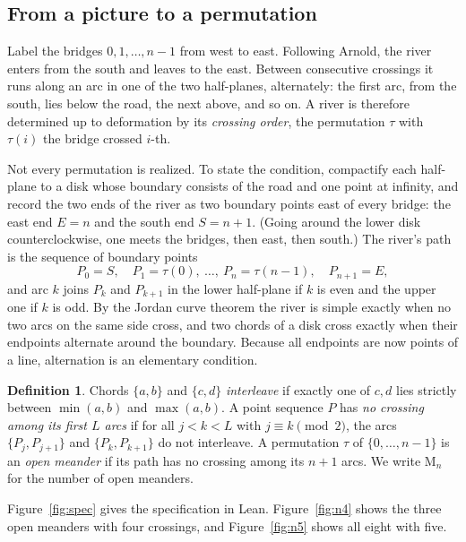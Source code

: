 \documentclass[11pt]{amsart}
\theoremstyle{definition}
\newtheorem{definition}[theorem]{Definition}
\theoremstyle{remark}
\newcommand{\Open}{\mathrm{M}}
\begin{document}
\subsection{From a picture to a permutation}
Label the bridges $0,1,\dots,n-1$ from west to east. Following Arnold, the river enters from
the south and leaves to the east. Between consecutive crossings it runs along an arc in one of
the two half-planes, alternately: the first arc, from the south, lies below the road, the next
above, and so on. A river is therefore determined up to deformation by its \emph{crossing
order}, the permutation $\tau$ with $\tau(i)$ the bridge crossed $i$-th.

Not every permutation is realized. To state the condition, compactify each half-plane to a
disk whose boundary consists of the road and one point at infinity, and record the two ends of
the river as two boundary points east of every bridge: the east end $E = n$ and the south end
$S = n+1$. (Going around the lower disk counterclockwise, one meets the bridges, then east,
then south.) The river's path is the sequence of boundary points
\[
  P_0 = S,\quad P_1 = \tau(0),\ \dots,\ P_n = \tau(n-1),\quad P_{n+1} = E,
\]
and arc $k$ joins $P_k$ and $P_{k+1}$ in the lower half-plane if $k$ is even and the upper one
if $k$ is odd. By the Jordan curve theorem the river is simple exactly when no two arcs on the
same side cross, and two chords of a disk cross exactly when their endpoints alternate around
the boundary. Because all endpoints are now points of a line, alternation is an elementary
condition.

\begin{definition}
Chords $\{a,b\}$ and $\{c,d\}$ \emph{interleave} if exactly one of $c,d$ lies strictly between
$\min(a,b)$ and $\max(a,b)$. A point sequence $P$ has \emph{no crossing among its first $L$
arcs} if for all $j<k<L$ with $j \equiv k \pmod 2$, the arcs $\{P_j,P_{j+1}\}$ and
$\{P_k,P_{k+1}\}$ do not interleave. A permutation $\tau$ of $\{0,\dots,n-1\}$ is an
\emph{open meander} if its path has no crossing among its $n+1$ arcs. We write $\Open_n$ for
the number of open meanders.
\end{definition}

\noindent Figure~\ref{fig:spec} gives the specification in Lean. Figure~\ref{fig:n4} shows the three open meanders with four
crossings, and Figure~\ref{fig:n5} shows all eight with five.
\end{document}

